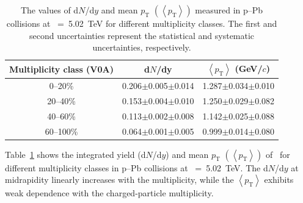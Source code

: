 \begin{table}[h!]
\caption{The values of d$N$/d$y$ and mean $p_{\mathrm{T}}$ $\left( \left\langle p_{\mathrm{T}} \right\rangle \right)$ measured in p--Pb collisions at \snn~=~5.02~TeV for different multiplicity classes. The first and second uncertainties represent the statistical and systematic uncertainties, respectively.}
\centering
\begin{tabular}{ccc}
\hline 
Multiplicity class (V0A) & d$N$/dy & $\left\langle p_{\mathrm{T}} \right\rangle$ (GeV/$c$) \\ \hline
0--20\% & 0.206$\pm$0.005$\pm$0.014 & 1.287$\pm$0.034$\pm$0.010 \\
20--40\% & 0.153$\pm$0.004$\pm$0.010 & 1.250$\pm$0.029$\pm$0.082 \\
40--60\% & 0.113$\pm$0.002$\pm$0.008 & 1.142$\pm$0.025$\pm$0.088 \\
60--100\% & 0.064$\pm$0.001$\pm$0.005 & 0.999$\pm$0.014$\pm$0.080 \\
\hline
\end{tabular}
\label{tab:ymp}
\end{table}

Table~\ref{tab:ymp} shows the integrated yield (d$N$/d$y$) and mean $p_{\mathrm{T}}$ $\left( \left\langle p_{\mathrm{T}} \right\rangle \right)$ of \fzero~for different multiplicity classes in p--Pb collisions at \snn~=~5.02~TeV. The d$N$/d$y$ at midrapidity linearly increases with the multiplicity, while the $\left\langle p_{\mathrm{T}} \right\rangle$ exhibits weak dependence with the charged-particle multiplicity. 

